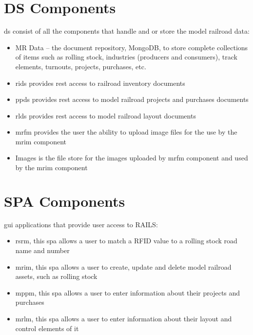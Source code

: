 \section{DS Components}
\gls{ds} consist of all the components that handle and or store the model railroad data:
\begin{itemize}
  \item MR Data – the document repository, MongoDB, to store complete collections of items such as rolling stock, industries (producers and consumers), track elements, turnouts, projects, purchases, etc.
  \item \gls{rids} provides \gls{rest} access to railroad inventory documents
  \item \gls{ppds} provides \gls{rest} access to model railroad projects and purchases documents
  \item \gls{rlds} provides \gls{rest} access to model railroad layout documents
  \item \gls{mrfm} provides the user the ability to upload image files for the use by the \gls{mrim} component
  \item Images is the file store for the images uploaded by \gls{mrfm} component and used by the \gls{mrim} component
\end{itemize}
\section{SPA Components}
\gls{gui} applications that provide user access to RAILS:
\begin{itemize}
  \item \gls{rsrm}, this \gls{spa} allows a user to match a RFID value to a rolling stock road name and number
  \item \gls{mrim}, this \gls{spa} allows a user to create, update and delete model railroad assets, such as rolling stock
  \item \gls{mppm}, this \gls{spa} allows a user to enter information about their projects and purchases
  \item \gls{mrlm}, this \gls{spa} allows a user to enter information about their layout and control elements of it
\end{itemize}
